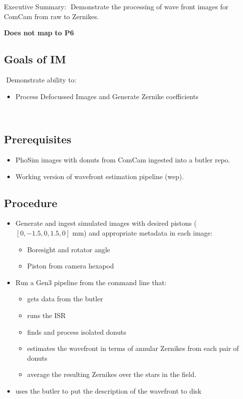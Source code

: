 Executive Summary:
​
Demonstrate the processing of wave front images for ComCam from raw to Zernikes.

\textbf{Does not map to P6}
​
\subsection{Goals of IM}
​
Demonstrate ability to:
​
\begin{itemize}
\item Process Defocussed Images and Generate Zernike coefficients
\end{itemize}
​
\subsection{Prerequisites}
\begin{itemize}
\item PhoSim images with donuts from ComCam ingested into a butler repo.
\item Working version of wavefront estimation pipeline (wep). 
\end{itemize}

\subsection{Procedure}
\begin{itemize}
\item Generate and ingest simulated images with desired pistons ($[0, -1.5, 0, 1.5, 0]$ mm)
  and appropriate
  metadata in each image:
  \begin{itemize}
  \item Boresight and rotator angle
  \item Piston from camera hexapod
  \end{itemize}
\item Run a Gen3 pipeline from the command line that:
  \begin{itemize}
  \item gets data from the butler
  \item runs the ISR
  \item finds and process isolated donuts
  \item estimates the wavefront in terms of annular Zernikes from each pair of donuts
  \item average the resulting Zernikes over the stars in the field.
  \end{itemize}
  \item uses the butler to put the description of the wavefront to disk
\end{itemize}

